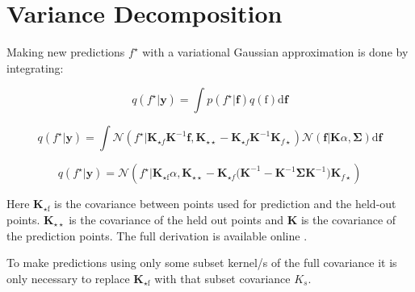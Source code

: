 \clearpage
\label{AppendixB}
\vspace{-1.75cm}
\section{Variance Decomposition}


Making new predictions $f ^ { \star }$ with a variational Gaussian approximation is done by integrating:


$$ q \left( f ^ { \star } | \mathbf { y } \right) = \int p \left( f ^ { \star } | \mathbf { f } \right) q ( \text{f} ) \text{d} \mathbf { f } $$




$$q \left( f ^ { \star } | \mathbf { y } \right) = \int \mathcal { N } \left( f ^ { \star } | \mathbf { K } _ { \star f } \mathbf { K } ^ { - 1} \mathbf { f } ,\mathbf { K } _ { \star \star } - \mathbf { K } _ { \star f } \mathbf { K } ^ { - 1} \mathbf { K } _ { f \star } \right) \mathcal { N } ( \mathbf { f } | \mathbf { K } \alpha ,\mathbf { \Sigma } ) \text{d} \mathbf { f }$$


$$ q \left( f ^ { \star } | \mathbf { y } \right) = \mathcal { N } \left( f ^ { \star } | \mathbf { K } _ { \star \text{f} } \alpha ,\mathbf { K } _ { \star \star } - \mathbf { K } _ { \star f } \mathbf { ( K } ^ { - 1} - \mathbf { K } ^ { - 1} \mathbf { \Sigma } \mathbf { K } ^ { - 1} ) \mathbf { K } _ { f \star } \right) $$

Here $\mathbf { K } _ { \star \text{f} }$ is the covariance between points used for prediction and the held-out points. $\mathbf { K } _ { \star \star }$ is the covariance of the held out points and $\mathbf { K }$ is the covariance of the prediction points. The full derivation is available online \cite{gpflow_conditional}. \par

To make predictions using only some subset kernel/s of the full covariance it is only necessary to replace $\mathbf { K } _ { \star \text{f} }$ with that subset covariance $K_s$. %
